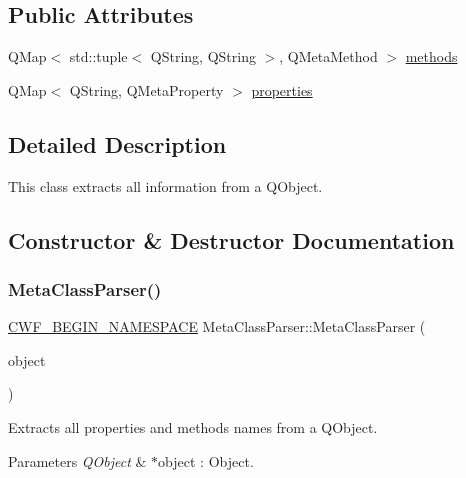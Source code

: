 \subsection*{Public Attributes}
\begin{DoxyCompactItemize}
\item 
Q\+Map$<$ std\+::tuple$<$ Q\+String, Q\+String $>$, Q\+Meta\+Method $>$ \hyperlink{class_meta_class_parser_a4c5651fa8ac8528bc01c0d2406a89c28}{methods}
\item 
Q\+Map$<$ Q\+String, Q\+Meta\+Property $>$ \hyperlink{class_meta_class_parser_ac79cc08f53b738fdb4e3c57d48474ac8}{properties}
\end{DoxyCompactItemize}


\subsection{Detailed Description}
This class extracts all information from a Q\+Object. 

\subsection{Constructor \& Destructor Documentation}
\mbox{\label{class_meta_class_parser_ae3df53e78d823b2edaa38fe6184c9e01}} 
\subsubsection{\texorpdfstring{Meta\+Class\+Parser()}{MetaClassParser()}}
{\footnotesize\ttfamily \hyperlink{cppwebframework__global_8h_a7492e9498cbaf9cd17dbc2215d3a0e48}{C\+W\+F\+\_\+\+B\+E\+G\+I\+N\+\_\+\+N\+A\+M\+E\+S\+P\+A\+CE} Meta\+Class\+Parser\+::\+Meta\+Class\+Parser (\begin{DoxyParamCaption}\item[{Q\+Object $\ast$}]{object }\end{DoxyParamCaption})\hspace{0.3cm}{\ttfamily [explicit]}}



Extracts all properties and methods names from a Q\+Object. 


\begin{DoxyParams}{Parameters}
{\em Q\+Object} & $\ast$object \+: Object. \\
\hline
\end{DoxyParams}


